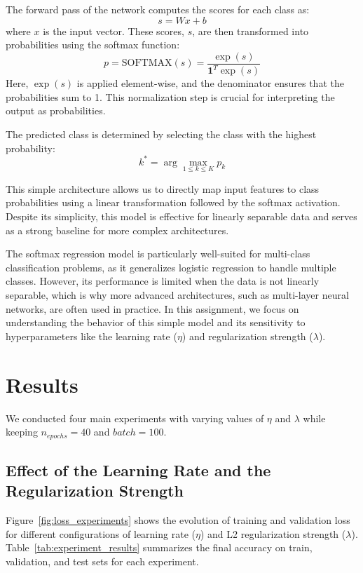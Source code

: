 \documentclass{article}
\begin{document}
The forward pass of the network computes the scores for each class as:
\[
s = W x + b
\]
where $x$ is the input vector. These scores, $s$, are then transformed into probabilities using the softmax function:
\[
p = \text{SOFTMAX}(s) = \frac{\exp(s)}{\mathbf{1}^T \exp(s)}
\]
Here, $\exp(s)$ is applied element-wise, and the denominator ensures that the probabilities sum to 1. This normalization step is crucial for interpreting the output as probabilities.

The predicted class is determined by selecting the class with the highest probability:
\[
k^* = \arg\max_{1 \leq k \leq K} p_k
\]

This simple architecture allows us to directly map input features to class probabilities using a linear transformation followed by the softmax activation. Despite its simplicity, this model is effective for linearly separable data and serves as a strong baseline for more complex architectures.

The softmax regression model is particularly well-suited for multi-class classification problems, as it generalizes logistic regression to handle multiple classes. However, its performance is limited when the data is not linearly separable, which is why more advanced architectures, such as multi-layer neural networks, are often used in practice. In this assignment, we focus on understanding the behavior of this simple model and its sensitivity to hyperparameters like the learning rate ($\eta$) and regularization strength ($\lambda$).

\section{Results}
We conducted four main experiments with varying values of $\eta$ and $\lambda$ while keeping $n_{epochs}=40$ and $batch=100$.

\subsection{Effect of the Learning Rate and the Regularization Strength}

Figure~\ref{fig:loss_experiments} shows the evolution of training and validation loss for different configurations of learning rate ($\eta$) and L2 regularization strength ($\lambda$). Table~\ref{tab:experiment_results} summarizes the final accuracy on train, validation, and test sets for each experiment.
\end{document}
